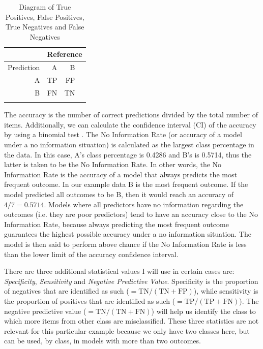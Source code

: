 \begin{table}%
  \centering
  \begin{tabular}{rrrr}
    \lsptoprule
               & \multicolumn{3}{c}{Reference} \\
    \midrule
    Prediction & A  & B                        \\
    A          & TP & FP                       \\
    B          & FN & TN                       \\
    \lspbottomrule
  \end{tabular}
  \caption{Diagram of True Positives, False Positives, True Negatives and False Negatives}\label{tab:tpfp-conf}
\end{table}

\newpage
The accuracy is the number of correct predictions divided by the total number of items. Additionally, we can calculate the confidence interval (CI) of the accuracy by using a binomial test \autocite{Clopper.1934, Newcombe.1998}. The No Information Rate (or accuracy of a model under a no information situation) is calculated as the largest class percentage in the data. In this case, A's class percentage is 0.4286 and B's is 0.5714, thus the latter is taken to be the No Information Rate. In other words, the No Information Rate is the accuracy of a model that always predicts the most frequent outcome. In our example data B is the most frequent outcome. If the model predicted all outcomes to be B, then it would reach an accuracy of $4/7=0.5714$. Models where all predictors have no information regarding the outcomes (i.e. they are poor predictors) tend to have an accuracy close to the No Information Rate, because always predicting the most frequent outcome guarantees the highest possible accuracy under a no information situation. The model is then said to perform above chance if the No Information Rate is less than the lower limit of the accuracy confidence interval.

There are three additional statistical values I will use in certain cases are: \textit{Specificity}, \textit{Sensitivity} and \textit{Negative Predictive Value}. Specificity is the proportion of negatives that are identified as such ($=\textrm{TN}/(\textrm{TN}+\textrm{FP})$), while sensitivity is the proportion of positives that are identified as such ($=\textrm{TP}/(\textrm{TP}+\textrm{FN})$). The negative predictive value ($=\textrm{TN}/(\textrm{TN}+\textrm{FN})$) will help us identify the class to which more items from other class are misclassified. These three statistics are not relevant for this particular example because we only have two classes here, but can be used, by class, in models with more than two outcomes.

